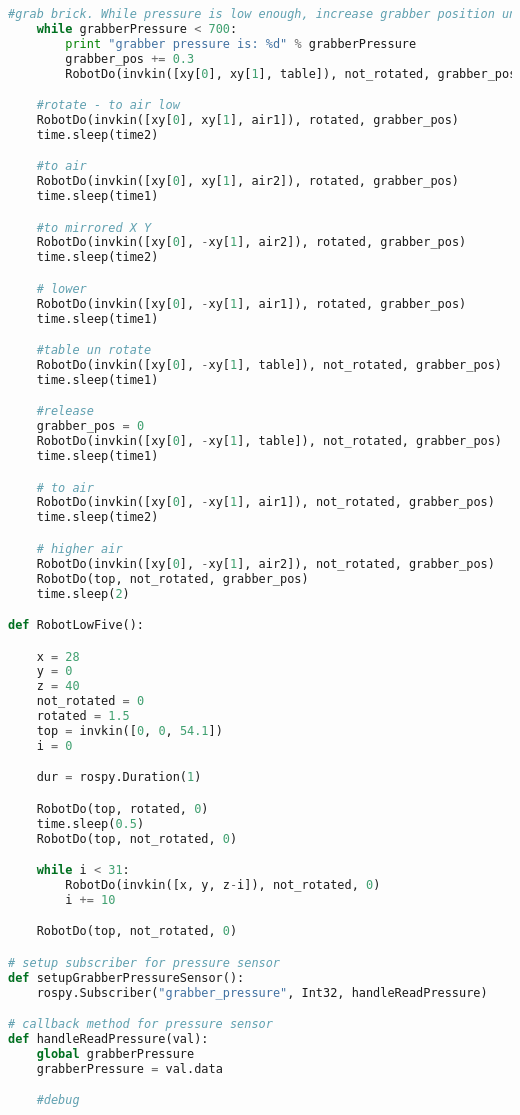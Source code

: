 \begin{lstlisting}[language=Python]
    #grab brick. While pressure is low enough, increase grabber position until brick is secured.
    while grabberPressure < 700:
        print "grabber pressure is: %d" % grabberPressure
        grabber_pos += 0.3
        RobotDo(invkin([xy[0], xy[1], table]), not_rotated, grabber_pos)

    #rotate - to air low
    RobotDo(invkin([xy[0], xy[1], air1]), rotated, grabber_pos)
    time.sleep(time2)

    #to air 
    RobotDo(invkin([xy[0], xy[1], air2]), rotated, grabber_pos)
    time.sleep(time1)

    #to mirrored X Y
    RobotDo(invkin([xy[0], -xy[1], air2]), rotated, grabber_pos)
    time.sleep(time2)

    # lower
    RobotDo(invkin([xy[0], -xy[1], air1]), rotated, grabber_pos)
    time.sleep(time1)

    #table un rotate
    RobotDo(invkin([xy[0], -xy[1], table]), not_rotated, grabber_pos)
    time.sleep(time1)

    #release
    grabber_pos = 0
    RobotDo(invkin([xy[0], -xy[1], table]), not_rotated, grabber_pos)
    time.sleep(time1)

    # to air
    RobotDo(invkin([xy[0], -xy[1], air1]), not_rotated, grabber_pos)
    time.sleep(time2)

    # higher air
    RobotDo(invkin([xy[0], -xy[1], air2]), not_rotated, grabber_pos)
    RobotDo(top, not_rotated, grabber_pos)
    time.sleep(2)

def RobotLowFive():

    x = 28
    y = 0
    z = 40
    not_rotated = 0
    rotated = 1.5
    top = invkin([0, 0, 54.1])
    i = 0    

    dur = rospy.Duration(1)

    RobotDo(top, rotated, 0)
    time.sleep(0.5)
    RobotDo(top, not_rotated, 0)

    while i < 31:
        RobotDo(invkin([x, y, z-i]), not_rotated, 0)
        i += 10

    RobotDo(top, not_rotated, 0)

# setup subscriber for pressure sensor
def setupGrabberPressureSensor():
    rospy.Subscriber("grabber_pressure", Int32, handleReadPressure)

# callback method for pressure sensor
def handleReadPressure(val):
    global grabberPressure
    grabberPressure = val.data

    #debug

\end{lstlisting}
